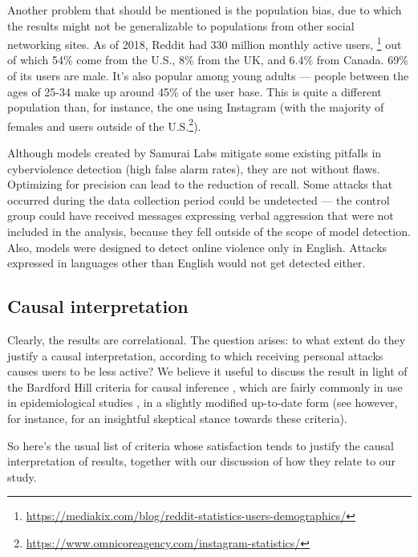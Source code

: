 \documentclass[a4paper,fleqn]{cas-dc}
\begin{document}
Another problem that should be mentioned is the population bias, due to
which the results might not be generalizable to populations from other
social networking sites. As of 2018, Reddit had 330 million monthly
active users,
\footnote{\url{https://mediakix.com/blog/reddit-statistics-users-demographics/}}
out of which 54\% come from the U.S., 8\% from the UK, and 6.4\% from
Canada. 69\% of its users are male. It's also popular among young adults
--- people between the ages of 25-34 make up around 45\% of the user
base. This is quite a different population than, for instance, the one
using Instagram (with the majority of females and users outside of the
U.S.\footnote{\url{https://www.omnicoreagency.com/instagram-statistics/}}).

Although models created by Samurai Labs mitigate some existing pitfalls
in cyberviolence detection (high false alarm rates), they are not
without flaws. Optimizing for precision can lead to the reduction of
recall. Some attacks that occurred during the data collection period
could be undetected --- the control group could have received messages
expressing verbal aggression that were not included in the analysis,
because they fell outside of the scope of model detection. Also, models
were designed to detect online violence only in English. Attacks
expressed in languages other than English would not get detected either.






\subsection{Causal interpretation}

Clearly, the results are correlational. The question arises: to what
extent do they justify a causal interpretation, according to which
receiving personal attacks causes users to be less active? We believe it
useful to discuss the result in light of the Bardford Hill criteria for
causal inference  \citep{hill1965environment}, which are fairly commonly in use in
epidemiological studies \citep{lucas2005association}, in a slightly
modified up-to-date form \citep{howick2009evolution} (see
however, for instance, \citep{pearl2018why} for an insightful
skeptical stance towards these criteria).

So here's the usual list of criteria whose satisfaction tends to justify
the causal interpretation of results, together with our discussion of
how they relate to our study.
\end{document}
